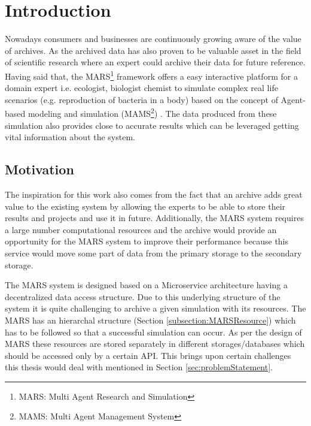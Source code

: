 \newpage
    \chapter{Introduction}
    Nowadays consumers and businesses are continuously growing aware of the value of archives. As the archived data has also proven
    to be valuable asset in the field of scientific research where an expert could archive their data for future reference. Having said that, the 
    MARS\footnote{MARS: Multi Agent Research and Simulation} framework offers a easy interactive platform for a domain expert i.e. ecologist, biologist
    chemist to simulate complex real life scenarios (e.g. reproduction of bacteria in a body) based on the concept of Agent-based modeling and simulation 
    (MAMS\footnote{MAMS: Multi Agent Management System}) \cite{agentModeling}. The data produced from these simulation also provides close to accurate 
    results which can be leveraged getting vital information about the system.

        \section{Motivation}
        The inspiration for this work also comes from the fact that an archive adds great value to the existing system by allowing the experts to be
        able to store their results and projects and use it in future. Additionally, the MARS system requires a large number computational resources and
        the archive would provide an opportunity for the MARS system to improve their
        performance because this service would move some part of data from the primary storage to the secondary storage. 

        The MARS system is designed based on a Microservice architecture \cite{MicroserviceNewMan} having a decentralized data \cite{atomic} access structure. 
        Due to this underlying structure of the system it is quite challenging to archive a given simulation with its resources. The MARS has an hierarchal
        structure (Section \ref{subsection:MARSResource}) which has to be followed so that a successful simulation can occur. As per the design of MARS these resources
        are stored separately in different storages/databases which should be accessed only by a certain API. This brings upon certain challenges 
        this thesis would deal with mentioned in Section 
        \ref{sec:problemStatement}.  

